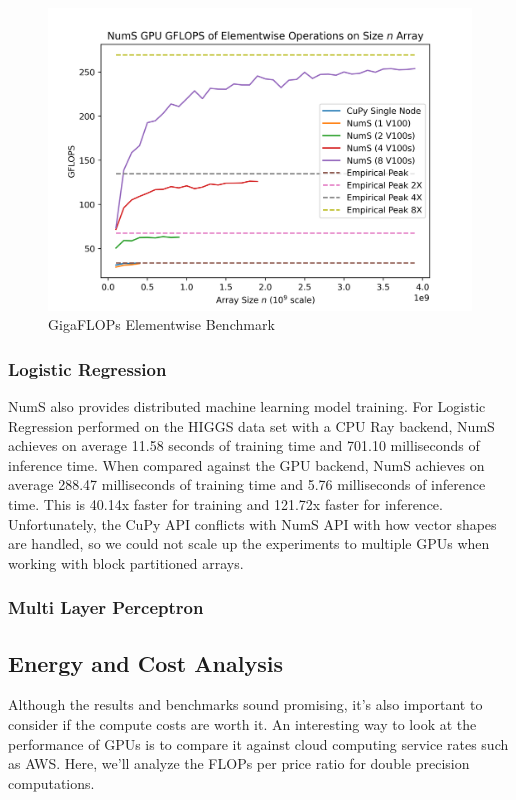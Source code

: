 \documentclass{article}
\begin{document}
\begin{figure}
  \centerline{\includegraphics[width=5in]{figures/NumS_GPU_GFLOPS_elementwise.png}}
  \caption{GigaFLOPs Elementwise Benchmark}
  \label{fig:elementwise}
\end{figure}


\subsubsection{Logistic Regression}
NumS also provides distributed machine learning model training. For Logistic Regression performed on the HIGGS data set with a CPU Ray backend, NumS achieves on average 11.58 seconds of training time and 701.10 milliseconds of inference time. When compared against the GPU backend, NumS achieves on average 288.47 milliseconds of training time and 5.76 milliseconds of inference time. This is 40.14x faster for training and 121.72x faster for inference. Unfortunately, the CuPy API conflicts with NumS API with how vector shapes are handled, so we could not scale up the experiments to multiple GPUs when working with block partitioned arrays. 

\subsubsection{Multi Layer Perceptron}


\subsection{Energy and Cost Analysis}
Although the results and benchmarks sound promising, it's also important to consider if the compute costs are worth it.
An interesting way to look at the performance of GPUs is to compare it against cloud computing service rates such as AWS. \cite{aws} Here, we'll analyze the FLOPs per price ratio for double precision computations.
\end{document}
